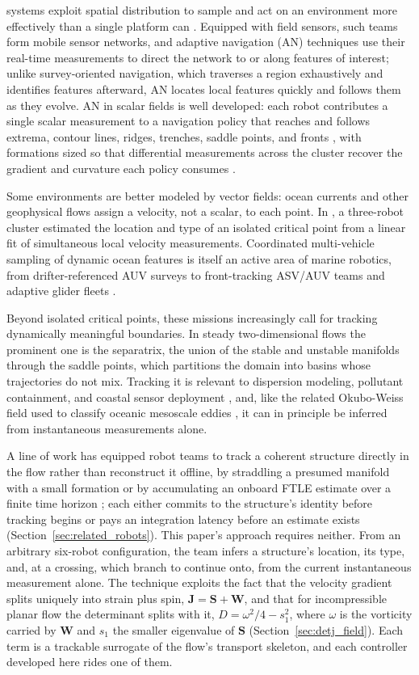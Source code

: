 \documentclass[lettersize,journal]{IEEEtran}
\begin{document}
 systems exploit spatial distribution to
sample and act on an environment more effectively than a single
platform can \cite{1}. Equipped with field sensors, such teams form
mobile sensor networks, and adaptive navigation (AN) techniques use
their real-time measurements to direct the network to or along features
of interest; unlike survey-oriented navigation, which traverses a
region exhaustively and identifies features afterward, AN locates local
features quickly and follows them as they evolve. AN in scalar fields
is well developed: each robot contributes a single scalar measurement
to a navigation policy that reaches and follows extrema, contour lines,
ridges, trenches, saddle points, and fronts \cite{26,27,28,29}, with
formations sized so that differential measurements across the cluster
recover the gradient and curvature each policy consumes \cite{15,26}.

Some environments are better modeled by vector fields: ocean currents
and other geophysical flows assign a velocity, not a scalar, to each
point. In \cite{14}, a three-robot cluster estimated the location
and type of an isolated critical point from a linear fit of
simultaneous local velocity measurements. Coordinated
multi-vehicle sampling of dynamic ocean features is itself an active
area of marine robotics, from drifter-referenced AUV surveys \cite{2}
to front-tracking ASV/AUV teams \cite{3} and adaptive glider fleets
\cite{4}.

Beyond isolated critical points, these missions increasingly call for
tracking dynamically meaningful boundaries. In steady two-dimensional
flows the prominent one is the separatrix, the union of the stable and
unstable manifolds through the saddle points, which partitions the
domain into basins whose trajectories do not mix. Tracking it is
relevant to dispersion modeling, pollutant containment, and coastal
sensor deployment \cite{6,7,8}, and, like the related Okubo-Weiss field
used to classify oceanic mesoscale eddies \cite{5}, it can in principle
be inferred from instantaneous measurements alone.

A line of work has equipped robot teams to track a coherent structure
directly in the flow rather than reconstruct it offline, by straddling
a presumed manifold with a small formation \cite{9,10,11,12} or by
accumulating an onboard FTLE estimate over a finite time horizon
\cite{13}; each either commits to the structure's identity before
tracking begins or pays an integration latency before an estimate
exists (Section~\ref{sec:related_robots}). This paper's approach
requires neither. From an arbitrary six-robot configuration, the team
infers a structure's location, its type, and, at a crossing, which
branch to continue onto, from the current instantaneous measurement
alone. The technique exploits the fact that the velocity gradient
splits uniquely into strain plus spin, $\mathbf{J} = \mathbf{S} +
\mathbf{W}$, and that for incompressible planar flow the determinant
splits with it, $D = \omega^2/4 - s_1^2$, where $\omega$ is the
vorticity carried by $\mathbf{W}$ and $s_1$ the smaller eigenvalue of
$\mathbf{S}$ (Section~\ref{sec:detj_field}). Each term is a trackable
surrogate of the flow's transport skeleton, and each controller
developed here rides one of them.
\end{document}
